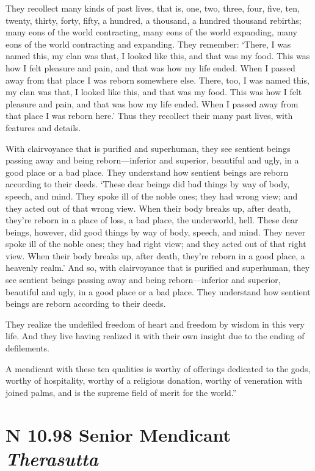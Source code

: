 \documentclass[12pt,openany]{book}%
\newcommand*{\suttatitleacronym}[1]{\smaller[2]{#1}\vspace*{.3em}}
\newcommand*{\suttatitletranslation}[1]{\linebreak{#1}}
\newcommand*{\suttatitleroot}[1]{\linebreak\smaller[2]\itshape{#1}}
\newcommand*{\tocacronym}[1]{\hspace*{-3.3em}{#1}\quad}
\newcommand*{\toctranslation}[1]{#1}
\newcommand*{\tocroot}[1]{(\textit{#1})}
\begin{document}
They recollect many kinds of past lives, that is, one, two, three, four, five, ten, twenty, thirty, forty, fifty, a hundred, a thousand, a hundred thousand rebirths; many eons of the world contracting, many eons of the world expanding, many eons of the world contracting and expanding. They remember: ‘There, I was named this, my clan was that, I looked like this, and that was my food. This was how I felt pleasure and pain, and that was how my life ended. When I passed away from that place I was reborn somewhere else. There, too, I was named this, my clan was that, I looked like this, and that was my food. This was how I felt pleasure and pain, and that was how my life ended. When I passed away from that place I was reborn here.’ Thus they recollect their many past lives, with features and details. 

With clairvoyance that is purified and superhuman, they see sentient beings passing away and being reborn—inferior and superior, beautiful and ugly, in a good place or a bad place. They understand how sentient beings are reborn according to their deeds. ‘These dear beings did bad things by way of body, speech, and mind. They spoke ill of the noble ones; they had wrong view; and they acted out of that wrong view. When their body breaks up, after death, they’re reborn in a place of loss, a bad place, the underworld, hell. These dear beings, however, did good things by way of body, speech, and mind. They never spoke ill of the noble ones; they had right view; and they acted out of that right view. When their body breaks up, after death, they’re reborn in a good place, a heavenly realm.’ And so, with clairvoyance that is purified and superhuman, they see sentient beings passing away and being reborn—inferior and superior, beautiful and ugly, in a good place or a bad place. They understand how sentient beings are reborn according to their deeds. 

They realize the undefiled freedom of heart and freedom by wisdom in this very life. And they live having realized it with their own insight due to the ending of defilements. 

A mendicant with these ten qualities is worthy of offerings dedicated to the gods, worthy of hospitality, worthy of a religious donation, worthy of veneration with joined palms, and is the supreme field of merit for the world.” 

%
\section*{{\suttatitleacronym AN 10.98}{\suttatitletranslation A Senior Mendicant }{\suttatitleroot Therasutta}}
\addcontentsline{toc}{section}{\tocacronym{AN 10.98} \toctranslation{A Senior Mendicant } \tocroot{Therasutta}}
\end{document}
